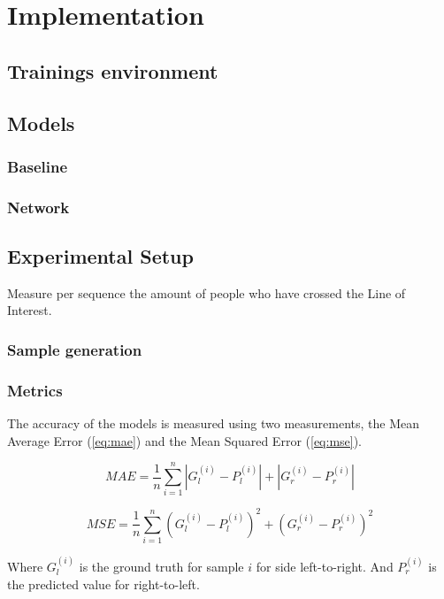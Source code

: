 \chapter{Implementation}

\section{Trainings environment}

\section{Models}
\subsection{Baseline}
\subsection{Network}

\section{Experimental Setup}
Measure per sequence the amount of people who have crossed the Line of Interest.

\subsection{Sample generation}

\subsection{Metrics}
The accuracy of the models is measured using two measurements, the Mean Average Error (\ref{eq:mae}) and the Mean Squared Error (\ref{eq:mse}).

\begin{equation}
\label{eq:mae}
	MAE = \frac{1}{n}\sum^n_{i=1}|G_l^{(i)}-P_l^{(i)}|+|G_r^{(i)}-P_r^{(i)}|
\end{equation}

\begin{equation}
\label{eq:mse}
	MSE = \frac{1}{n}\sum^n_{i=1}(G_l^{(i)}-P_l^{(i)})^2+(G_r^{(i)}-P_r^{(i)})^2
\end{equation}

Where $G_l^{(i)}$ is the ground truth for sample $i$ for side left-to-right. And $P_r^{(i)}$ is the predicted value for right-to-left.

